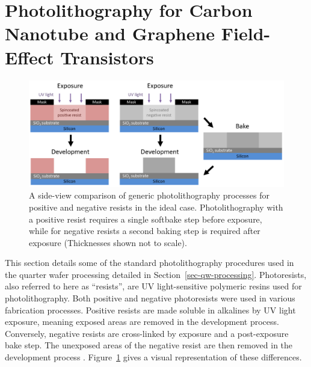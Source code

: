 \documentclass[
  a4paper,
]{scrbook}
\begin{document}
\hypertarget{sec-photolithography}{%
\section{Photolithography for Carbon Nanotube and Graphene Field-Effect
Transistors}\label{sec-photolithography}}

\begin{figure}

{\centering \includegraphics{./figures/ch4/positive-negative-photolithography.png}

}

\caption{\label{fig-photolithography-types}A side-view comparison of
generic photolithography processes for positive and negative resists in
the ideal case. Photolithography with a positive resist requires a
single softbake step before exposure, while for negative resists a
second baking step is required after exposure (Thicknesses shown not to
scale).}

\end{figure}

This section details some of the standard photolithography procedures
used in the quarter wafer processing detailed in
Section~\ref{sec-qw-processing}. Photoresists, also referred to here as
``resists'', are UV light-sensitive polymeric resins used for
photolithography. Both positive and negative photoresists were used in
various fabrication processes. Positive resists are made soluble in
alkalines by UV light exposure, meaning exposed areas are removed in the
development process. Conversely, negative resists are cross-linked by
exposure and a post-exposure bake step. The unexposed areas of the
negative resist are then removed in the development process
\autocite{Microchemicals}. Figure~\ref{fig-photolithography-types} gives
a visual representation of these differences.
\end{document}
